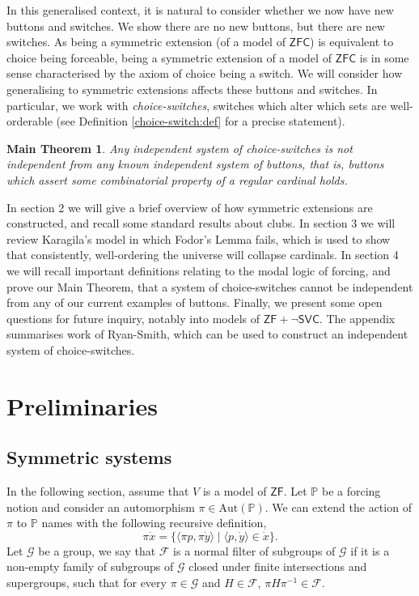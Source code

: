 \documentclass[a4paper,11pt]{amsart}
\newtheorem*{main}{Main Theorem}
\theoremstyle{definition}
\newcommand{\p}{\mathbb{P}}
\newcommand{\ZF}{\mathsf{ZF}}
\newcommand{\ZFC}{\mathsf{ZFC}}
\newcommand{\SVC}{\mathsf{SVC}}
\begin{document}
In this generalised context, it is natural to consider whether we now have new buttons and switches. We show there are no new buttons, but there are new switches. As being a symmetric extension (of a model of $\ZFC$) is equivalent to choice being forceable, being a symmetric extension of a model of $\ZFC$ is in some sense characterised by the axiom of choice being a switch. We will consider how generalising to symmetric extensions affects these buttons and switches. In particular, we work with \emph{choice-switches}, switches which alter which sets are well-orderable (see Definition \ref{choice-switch:def} for a precise statement). 

\begin{main}
    Any independent system of choice-switches is not independent from any known independent system of buttons, that is, buttons which assert some combinatorial property of a regular cardinal holds. 
\end{main}

In section 2 we will give a brief overview of how symmetric extensions are constructed, and recall some standard results about clubs. In section 3 we will review Karagila's model in which Fodor's Lemma fails, which is used to show that consistently, well-ordering the universe will collapse cardinals. In section 4 we will recall important definitions relating to the modal logic of forcing, and prove our Main Theorem, that a system of choice-switches cannot be independent from any of our current examples of buttons. Finally, we present some open questions for future inquiry, notably into models of $\ZF + \neg \SVC$. The appendix summarises work of Ryan-Smith, which can be used to construct an independent system of choice-switches.  

\section{Preliminaries}

\subsection{Symmetric systems}
In the following section, assume that $V$ is a model of $\ZF$. Let $\p$ be a forcing notion and consider an automorphism $\pi \in \text{Aut}(\p)$. We can extend the action of $\pi$ to $\p$ names with the following recursive definition, \[\pi \dot{x} = \{ \langle \pi p, \pi \dot{y}\rangle \mid \langle p, \dot{y} \rangle \in \dot{x} \}.\]
Let $\mathscr{G}$ be a group, we say that $\mathscr{F}$ is a normal filter of subgroups of $\mathscr{G}$ if it is a non-empty family of subgroups of $\mathscr{G}$ closed under finite intersections and supergroups, such that for every $\pi \in \mathscr{G}$ and $H \in \mathscr{F}$, $\pi H \pi^{-1} \in \mathscr{F}$. 
\end{document}

